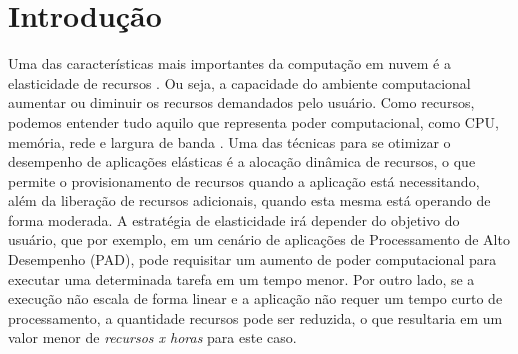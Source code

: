 \documentclass[twoside,english,brazilian]{UNISINOSartigo}
\begin{document}
%

%


\section{Introdução}

Uma das características mais importantes da computação em nuvem é a elasticidade de recursos \cite{Mell2012,Mauch20131408}. Ou seja, a capacidade do ambiente computacional aumentar ou diminuir os recursos demandados pelo usuário. Como recursos, podemos entender tudo aquilo que representa poder computacional, como CPU, memória, rede e largura de banda \cite{Kominos2017}. Uma das técnicas para se otimizar o desempenho de aplicações elásticas é a alocação dinâmica de recursos, o que permite o provisionamento de recursos quando a aplicação está necessitando, além da liberação de recursos adicionais, quando esta mesma está operando de forma moderada. A estratégia de elasticidade irá depender do objetivo do usuário, que por exemplo, em um cenário de aplicações de Processamento de Alto Desempenho (PAD), pode requisitar um aumento de poder computacional para executar uma determinada tarefa em um tempo menor. Por outro lado, se a execução não escala de forma linear e a aplicação não requer um tempo curto de processamento, a quantidade recursos pode ser reduzida, o que resultaria em um valor menor de \textit{recursos x horas} para este caso.
\end{document}
